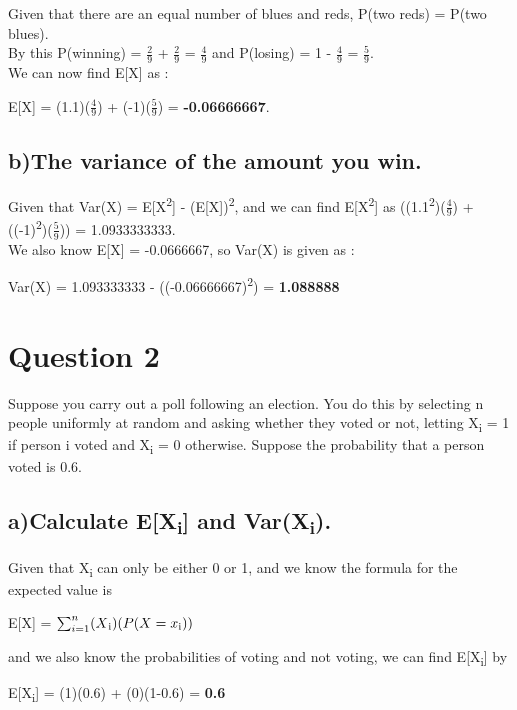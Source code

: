 \documentclass{report}
\begin{document}
		Given that there are an equal number of blues and reds, P(two reds) = P(two blues).\\
		By this P(winning) = $\frac{2}{9}$ + $\frac{2}{9}$ = $\frac{4}{9}$ and P(losing) = 1 - $\frac{4}{9}$ = $\frac{5}{9}$.\\
		We can now find E[X] as :
		
		\begin{center}
			E[X] = (1.1)($\frac{4}{9}$) + (-1)($\frac{5}{9}$) = \textbf{-0.06666667}.
		\end{center}
	
	
	
		\subsection*{b)The variance of the amount you win.}
		Given that Var(X) = E[X\textsuperscript{2}] - (E[X])\textsuperscript{2}, and we can find E[X\textsuperscript{2}] as ((1.1\textsuperscript{2})($\frac{4}{9}$) + ((-1)\textsuperscript{2})($\frac{5}{9}$)) = 1.0933333333.\\
		We also know E[X] = -0.0666667, so Var(X) is given as :
		
		\begin{center}
			Var(X) = 1.093333333 - ((-0.06666667)\textsuperscript{2}) = \textbf{1.088888}
		\end{center}
		
		
		
		
	\section*{\hfil Question 2 \hfil}
	Suppose you carry out a poll following an election. You do this by selecting n people uniformly at random and asking whether they voted or not, letting X\textsubscript{i} = 1 if person i voted and X\textsubscript{i} = 0 otherwise. Suppose the probability that a person voted is 0.6.
	
		\subsection*{a)Calculate E[X\textsubscript{i}] and Var(X\textsubscript{i}).}
		Given that X\textsubscript{i} can only be either 0 or 1, and we know the formula for the expected value is
		\begin{center}
			E[X] = $\sum_{i=1}^{n} (X\textsubscript{i})(P(X = x\textsubscript{i}))$
		\end{center} 
		and we also know the probabilities of voting and not voting, we can find E[X\textsubscript{i}] by 
		\begin{center}
			E[X\textsubscript{i}] = (1)(0.6) + (0)(1-0.6) = \textbf{0.6}
		\end{center}
	
\end{document}
